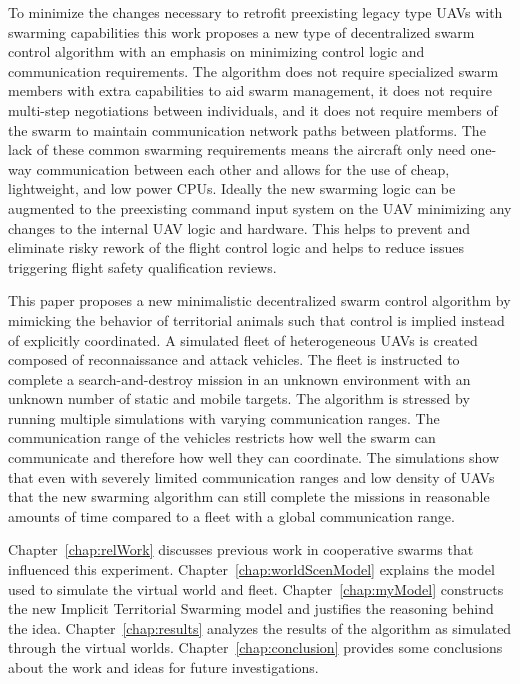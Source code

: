 To minimize the changes necessary to retrofit preexisting legacy type UAVs with swarming capabilities this work proposes a new type of decentralized swarm control algorithm with an emphasis on minimizing control logic and communication requirements.  The algorithm does not require specialized swarm members with extra capabilities to aid swarm management, it does not require multi-step negotiations between individuals, and it does not require members of the swarm to maintain communication network paths between platforms.  The lack of these common swarming requirements means the aircraft only need one-way communication between each other and allows for the use of cheap, lightweight, and low power CPUs.  Ideally the new swarming logic can be augmented to the preexisting command input system on the UAV minimizing any changes to the internal UAV logic and hardware.  This helps to prevent and eliminate risky rework of the flight control logic and helps to reduce issues triggering flight safety qualification reviews.

This paper proposes a new minimalistic decentralized swarm control algorithm by mimicking the behavior of territorial animals such that control is implied instead of explicitly coordinated.  A simulated fleet of heterogeneous UAVs is created composed of reconnaissance and attack vehicles.  The fleet is instructed to complete a search-and-destroy mission in an unknown environment with an unknown number of static and mobile targets.  The algorithm is stressed by running multiple simulations with varying communication ranges.  The communication range of the vehicles restricts how well the swarm can communicate and therefore how well they can coordinate.  The simulations show that even with severely limited communication ranges and low density of UAVs that the new swarming algorithm can still complete the missions in reasonable amounts of time compared to a fleet with a global communication range.

Chapter~\ref{chap:relWork} discusses previous work in cooperative swarms that influenced this experiment.  Chapter~\ref{chap:worldScenModel} explains the model used to simulate the virtual world and fleet.  Chapter~\ref{chap:myModel} constructs the new Implicit Territorial Swarming model and justifies the reasoning behind the idea.  Chapter~\ref{chap:results} analyzes the results of the algorithm as simulated through the virtual worlds.  Chapter~\ref{chap:conclusion} provides some conclusions about the work and ideas for future investigations.

